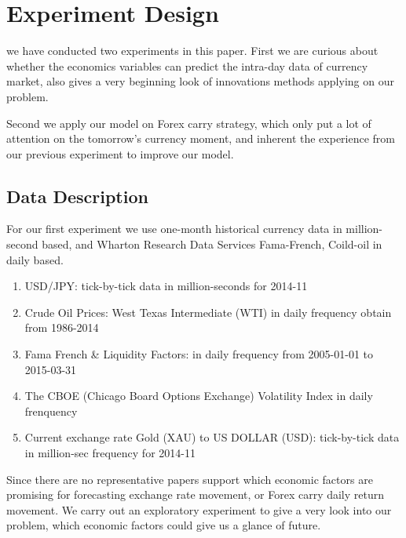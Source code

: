 \chapter{Experiment Design}

    we have conducted two experiments in this paper. First we are curious about whether the economics variables can predict the intra-day data of currency market, also gives a very beginning look of innovations methods applying on our problem. 

    Second we apply our model on Forex carry strategy, which only put a lot of attention on the tomorrow's currency moment, and inherent the experience from our previous experiment to improve our model.


\section{Data Description}

For our first experiment we use one-month historical currency data in million-second based, and Wharton Research Data Services Fama-French, Coild-oil in daily based.

\begin{enumerate}
\item{USD/JPY: tick-by-tick data in million-seconds for 2014-11}
\item{Crude Oil Prices: West Texas Intermediate (WTI) in daily frequency obtain from 1986-2014}
\item{Fama French \& Liquidity Factors: in daily frequency
from 2005-01-01 to 2015-03-31}
\item{The CBOE (Chicago Board Options Exchange) Volatility Index in daily frenquency}
\item{Current exchange rate Gold (XAU) to US DOLLAR (USD): tick-by-tick data in million-sec frequency for 2014-11}
\end{enumerate}
\newpage


    
    Since there are no representative papers support which economic factors are promising for forecasting exchange rate movement, or Forex carry daily return movement. We carry out an exploratory experiment to give a very look into our problem, which economic factors could give us a glance of future.
    
    
